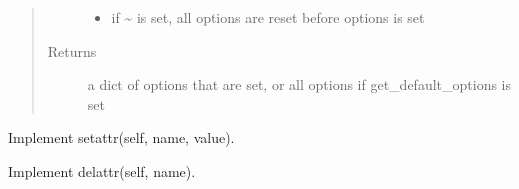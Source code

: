 \documentclass[a4paper,10pt,english]{sphinxmanual}
\begin{document}
\begin{fulllineitems}
\begin{fulllineitems}
\begin{quote}
\begin{description}
\begin{itemize}
\item {}
\sphinxAtStartPar
{} \textendash{} if \textasciitilde{} is set, all options are reset before options is set

\end{itemize}

\item[{Returns}] \leavevmode
\sphinxAtStartPar
a dict of options that are set, or all options if get\_default\_options is set

\end{description}\end{quote}

\end{fulllineitems}


\begin{fulllineitems}
\label{\detokenize{fagus.utils:fagus.utils.FagusMeta.__setattr__}}
\pysigstartsignatures
{}
\pysigstopsignatures
\sphinxAtStartPar
Implement setattr(self, name, value).

\end{fulllineitems}


\begin{fulllineitems}
\label{\detokenize{fagus.utils:fagus.utils.FagusMeta.__getattr__}}
\pysigstartsignatures
{}
\pysigstopsignatures
\end{fulllineitems}


\begin{fulllineitems}
\label{\detokenize{fagus.utils:fagus.utils.FagusMeta.__delattr__}}
\pysigstartsignatures
{}
\pysigstopsignatures
\sphinxAtStartPar
Implement delattr(self, name).

\end{fulllineitems}


\end{fulllineitems}
\end{document}
